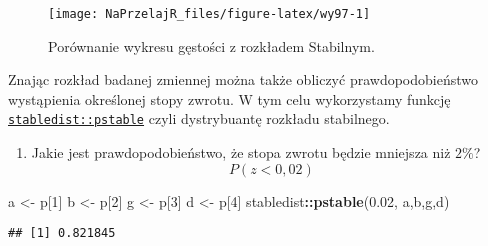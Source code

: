 \documentclass[polish,]{book}
\newenvironment{Shaded}{\begin{snugshade}}{\end{snugshade}}
\newcommand{\DecValTok}[1]{\textcolor[rgb]{0.00,0.00,0.81}{#1}}
\newcommand{\FloatTok}[1]{\textcolor[rgb]{0.00,0.00,0.81}{#1}}
\newcommand{\KeywordTok}[1]{\textcolor[rgb]{0.13,0.29,0.53}{\textbf{#1}}}
\newcommand{\NormalTok}[1]{#1}
\newcommand{\OperatorTok}[1]{\textcolor[rgb]{0.81,0.36,0.00}{\textbf{#1}}}
\newcommand{\StringTok}[1]{\textcolor[rgb]{0.31,0.60,0.02}{#1}}
\providecommand{\tightlist}{%
  \setlength{\itemsep}{0pt}\setlength{\parskip}{0pt}}
\begin{document}
\begin{figure}[h]

{\centering \texttt{[image: NaPrzelajR\_files/figure-latex/wy97-1]} 

}

\caption{Porównanie wykresu gęstości z rozkładem Stabilnym.}\label{fig:wy97}
\end{figure}

Znając rozkład badanej zmiennej można także obliczyć prawdopodobieństwo wystąpienia określonej stopy zwrotu. W tym celu wykorzystamy funkcję \href{https://rdrr.io/cran/stabledist/man/dist-stable.html}{\texttt{stabledist::pstable}}
czyli dystrybuantę rozkładu stabilnego.

\begin{enumerate}
\def\labelenumi{\arabic{enumi}.}
\tightlist
\item
  Jakie jest prawdopodobieństwo, że stopa zwrotu będzie mniejsza niż \(2\%\)?
  \[P(z<0,02)\]
\end{enumerate}

\begin{Shaded}
\begin{Highlighting}[]
\NormalTok{a <-}\StringTok{ }\NormalTok{p[}\DecValTok{1}\NormalTok{]}
\NormalTok{b <-}\StringTok{ }\NormalTok{p[}\DecValTok{2}\NormalTok{]}
\NormalTok{g <-}\StringTok{ }\NormalTok{p[}\DecValTok{3}\NormalTok{]}
\NormalTok{d <-}\StringTok{ }\NormalTok{p[}\DecValTok{4}\NormalTok{]}
\NormalTok{stabledist}\OperatorTok{::}\KeywordTok{pstable}\NormalTok{(}\FloatTok{0.02}\NormalTok{, a,b,g,d)}
\end{Highlighting}
\end{Shaded}

\begin{verbatim}
## [1] 0.821845
\end{verbatim}
\end{document}
